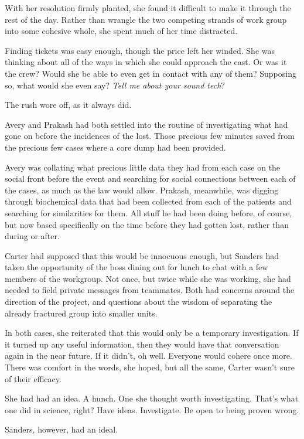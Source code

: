 With her resolution firmly planted, she found it difficult to make it through the rest of the day. Rather than wrangle the two competing strands of work group into some cohesive whole, she spent much of her time distracted.

Finding tickets was easy enough, though the price left her winded. She was thinking about all of the ways in which she could approach the cast. Or was it the crew? Would she be able to even get in contact with any of them? Supposing so, what would she even say? \emph{Tell me about your sound tech}?

The rush wore off, as it always did.

Avery and Prakash had both settled into the routine of investigating what had gone on before the incidences of the lost. Those precious few minutes saved from the precious few cases where a core dump had been provided.

Avery was collating what precious little data they had from each case on the social front before the event and searching for social connections between each of the cases, as much as the law would allow. Prakash, meanwhile, was digging through biochemical data that had been collected from each of the patients and searching for similarities for them. All stuff he had been doing before, of course, but now based specifically on the time before they had gotten lost, rather than during or after.

Carter had supposed that this would be innocuous enough, but Sanders had taken the opportunity of the boss dining out for lunch to chat with a few members of the workgroup. Not once, but twice while she was working, she had needed to field private messages from teammates. Both had concerns around the direction of the project, and questions about the wisdom of separating the already fractured group into smaller units.

In both cases, she reiterated that this would only be a temporary investigation. If it turned up any useful information, then they would have that conversation again in the near future. If it didn't, oh well. Everyone would cohere once more. There was comfort in the words, she hoped, but all the same, Carter wasn't sure of their efficacy.

She had had an idea. A hunch. One she thought worth investigating. That's what one did in science, right? Have ideas. Investigate. Be open to being proven wrong.

Sanders, however, had an ideal.

